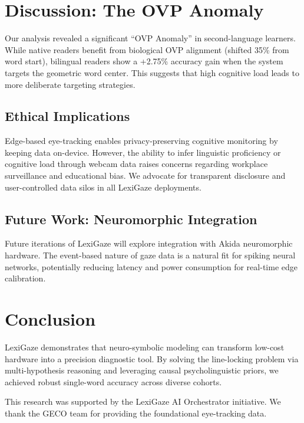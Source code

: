 \documentclass{article}
\begin{document}
\section{Discussion: The OVP Anomaly}

Our analysis revealed a significant ``OVP Anomaly'' in second-language learners. While native readers benefit from biological OVP alignment (shifted 35\% from word start), bilingual readers show a +2.75\% accuracy gain when the system targets the geometric word center. This suggests that high cognitive load leads to more deliberate targeting strategies.

\subsection{Ethical Implications}

Edge-based eye-tracking enables privacy-preserving cognitive monitoring by keeping data on-device. However, the ability to infer linguistic proficiency or cognitive load through webcam data raises concerns regarding workplace surveillance and educational bias. We advocate for transparent disclosure and user-controlled data silos in all LexiGaze deployments.

\subsection{Future Work: Neuromorphic Integration}

Future iterations of LexiGaze will explore integration with Akida neuromorphic hardware. The event-based nature of gaze data is a natural fit for spiking neural networks, potentially reducing latency and power consumption for real-time edge calibration.

\section{Conclusion}

LexiGaze demonstrates that neuro-symbolic modeling can transform low-cost hardware into a precision diagnostic tool. By solving the line-locking problem via multi-hypothesis reasoning and leveraging causal psycholinguistic priors, we achieved robust single-word accuracy across diverse cohorts.

\begin{ack}
This research was supported by the LexiGaze AI Orchestrator initiative. We thank the GECO team for providing the foundational eye-tracking data.
\end{ack}



\end{document}
